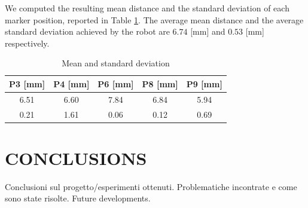 \documentclass[a4paper, 10 pt, conference]{ieeeconf}      %
\begin{document}
We computed the resulting mean distance and the standard deviation of each marker position, reported in Table \ref{tab:mean}. The average mean distance and the average standard deviation achieved by the robot are $6.74$ [mm] and $0.53$ [mm] respectively.

\begin{table}[h]
\begin{center}
\caption{Mean and standard deviation}
\label{tab:mean}
\begin{tabular}{|c||c||c||c||c|}
\hline
\textbf{P3 [mm]} & \textbf{P4 [mm]} & \textbf{P6 [mm]} & \textbf{P8 [mm]} & \textbf{P9 [mm]} \\
\hline
6.51 & 6.60 & 7.84 & 6.84 & 5.94\\
0.21 & 1.61 & 0.06 & 0.12 & 0.69\\
\hline
\end{tabular}
\end{center}
\end{table}

\section{CONCLUSIONS}

Conclusioni sul progetto/esperimenti ottenuti.
Problematiche incontrate e come sono state risolte.
Future developments.

\addtolength{\textheight}{-12cm}   %



\end{document}
